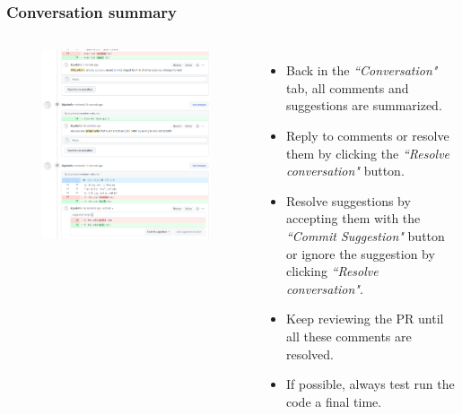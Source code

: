 \documentclass[aspectratio=169]{beamer}
\begin{document}
\begin{frame}
	\frametitle{Conversation summary}
	\begin{columns}[c]
		
		\vspace{-.2cm}
		\begin{figure}
			\centering
			\includegraphics[width=\textwidth]{./img/conversation-summary.png}
		\end{figure}
		
		\begin{itemize}
			\setlength\itemsep{.68em}
			\item Back in the \textit{``Conversation"} tab, all comments and suggestions are summarized. 
			\item Reply to comments or resolve them by clicking the \textit{``Resolve conversation"} button. 
                \item Resolve suggestions by accepting them with the \textit{``Commit Suggestion"} button or ignore the suggestion by clicking \textit{``Resolve conversation"}.
			\item Keep reviewing the PR until all these comments are resolved.
			\item If possible, always test run the code a final time.
		\end{itemize}
		
	\end{columns}
\end{frame}
\end{document}
